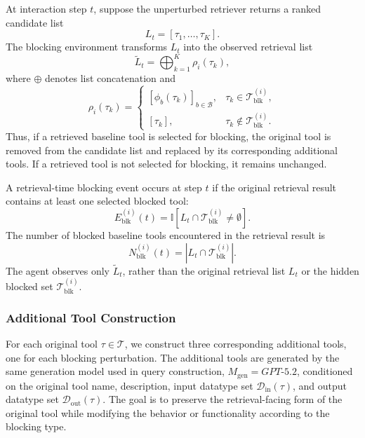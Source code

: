 At interaction step $t$, suppose the unperturbed retriever returns a ranked candidate list
\begin{equation}
L_t = [\tau_1,\ldots,\tau_K].
\end{equation}
The blocking environment transforms $L_t$ into the observed retrieval list
\begin{equation}
\widetilde{L}_t
=
\bigoplus_{k=1}^{K} \rho_i(\tau_k),
\end{equation}
where $\oplus$ denotes list concatenation and
\begin{equation}
\rho_i(\tau_k)
=
\begin{cases}
[\phi_b(\tau_k)]_{b\in\mathcal{B}}, 
& \tau_k \in \mathcal{T}^{(i)}_{\mathrm{blk}},\\
[\tau_k], 
& \tau_k \notin \mathcal{T}^{(i)}_{\mathrm{blk}}.
\end{cases}
\end{equation}
Thus, if a retrieved baseline tool is selected for blocking, the original tool is removed from the candidate list and replaced by its corresponding additional tools. 
If a retrieved tool is not selected for blocking, it remains unchanged.

A retrieval-time blocking event occurs at step $t$ if the original retrieval result contains at least one selected blocked tool:
\begin{equation}
E^{(i)}_{\mathrm{blk}}(t)
=
\mathbb{I}
\left[
L_t \cap \mathcal{T}^{(i)}_{\mathrm{blk}}
\neq \emptyset
\right].
\end{equation}
The number of blocked baseline tools encountered in the retrieval result is
\begin{equation}
N^{(i)}_{\mathrm{blk}}(t)
=
\left|
L_t \cap \mathcal{T}^{(i)}_{\mathrm{blk}}
\right|.
\end{equation}
The agent observes only $\widetilde{L}_t$, rather than the original retrieval list $L_t$ or the hidden blocked set $\mathcal{T}^{(i)}_{\mathrm{blk}}$.

\subsubsection{Additional Tool Construction}
\label{app:noisy-tool-construction}


For each original tool $\tau \in \mathcal{T}$, we construct three corresponding additional tools, one for each blocking perturbation.
The additional tools are generated by the same generation model used in query construction, $M_{\mathrm{gen}}=\textit{GPT-5.2}$, conditioned on the original tool name, description, input datatype set 
$\mathcal{D}_{\mathrm{in}}(\tau)$, and output datatype set 
$\mathcal{D}_{\mathrm{out}}(\tau)$.
The goal is to preserve the retrieval-facing form of the original tool while modifying the behavior or functionality according to the blocking type.

